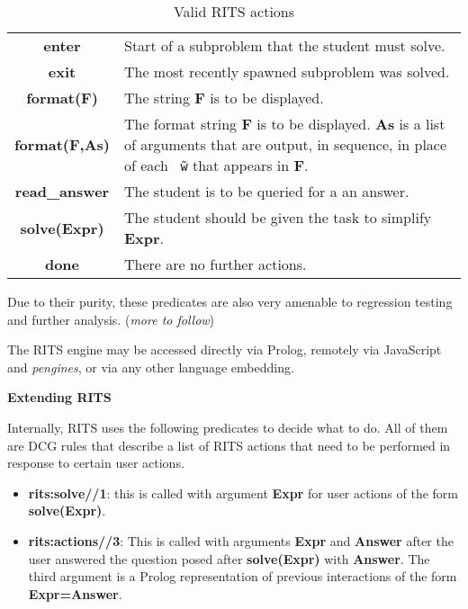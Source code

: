 \documentclass[a4paper,11pt]{article}
\begin{document}
\begin{table}[ht]
  \centering
  \begin{tabular}{cp{7cm}}
    \hline
    \textbf{enter} & Start of a subproblem that the student must solve.\\
    \textbf{exit} & The most recently spawned subproblem was solved.\\
    \textbf{format(F)} & The string \textbf{F} is to be displayed.\\
    \textbf{format(F,As)} & The format string \textbf{F} is to be displayed. \textbf{As} is a list of arguments that are output, in sequence, in place of each \texttt{\~\ $\!\!\!$w} that appears in \textbf{F}.\\
    \textbf{read\_answer} & The student is to be queried for a an answer.\\
    \textbf{solve(Expr)} & The student should be given the task to simplify \textbf{Expr}.\\
    \textbf{done} & There are no further actions.\\
    \hline
  \end{tabular}
\caption{Valid RITS actions}
  \label{tab:ritsactions}
\end{table}


\vspace{0.7cm}

Due to their purity, these predicates are also very amenable to
regression testing and further analysis. (\textit{more to follow})

\vspace{0.7cm}

The RITS engine may be accessed directly via Prolog, remotely via
JavaScript and \textit{pengines}, or via any other language embedding.

\bigskip
\begin{center}
  \large\textbf{Extending RITS}
\end{center}

\medskip
\noindent Internally, RITS uses the following predicates to decide
what to do. All of them are DCG rules that describe a list of RITS
actions that need to be performed in response to certain user actions.

\begin{itemize}
\item \textbf{rits:solve//1}: this is called with argument \textbf{Expr}
  for user actions of the form \textbf{solve(Expr)}.

\item \textbf{rits:actions//3}: This is called with arguments \textbf{Expr}
  and \textbf{Answer} after the user answered the question posed after
  \textbf{solve(Expr)} with \textbf{Answer}. The third argument is a
  Prolog representation of previous interactions of the form
  \textbf{Expr=Answer}.

\end{itemize}
\end{document}
